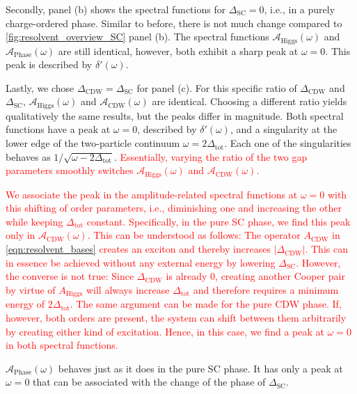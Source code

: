 \documentclass[
    reprint, 
    aps,
    preprintnumbers,
    twocolumn,
    prb,
    superscriptaddress
]{revtex4-2}
\newcommand{\spectral}[1]{\mathcal{A}_\text{#1}  (\omega)}
\begin{document}
Secondly, panel (b) shows the spectral functions for $\Delta_\text{SC} = 0$, i.e., in a purely charge-ordered phase.
Similar to before, there is not much change compared to \autoref{fig:resolvent_overview_SC} panel (b).
The spectral functions $\spectral{Higgs}$ and $\spectral{Phase}$ are still identical, however, both exhibit a sharp peak at $\omega=0$.
This peak is described by $\delta'(\omega)$.

Lastly, we chose $\Delta_\text{CDW} = \Delta_\text{SC}$ for panel (c).
For this specific ratio of $\Delta_\text{CDW}$ and $\Delta_\text{SC}$, $\spectral{Higgs}$ and $\spectral{CDW}$ are identical.
Choosing a different ratio yields qualitatively the same results, but the peaks differ in magnitude.
Both spectral functions have a peak at $\omega = 0$, described by $\delta'(\omega)$, and a singularity at the lower edge of the two-particle continuum $\omega = 2\Delta_\text{tot}$.
Each one of the singularities behaves as $1/\sqrt{\omega - 2 \Delta_\text{tot}}$.
\textcolor{red}{Essentially, varying the ratio of the two gap parameters smoothly switches $\spectral{Higgs}$ and $\spectral{CDW}$.}

\textcolor{red}{We associate the peak in the amplitude-related spectral functions at $\omega=0$ with this shifting of order parameters, i.e., diminishing one and increasing the other while keeping $\Delta_\text{tot}$ constant.
Specifically, in the pure SC phase, we find this peak only in $\spectral{CDW}$.
This can be understood as follows: The operator $A_\text{CDW}$ in \eqref{eqn:resolvent_bases} creates an exciton and thereby increases $|\Delta_\text{CDW}|$.
This can in essence be achieved without any external energy by lowering $\Delta_\text{SC}$.
However, the converse is not true: Since $\Delta_\text{CDW}$ is already 0, creating another Cooper pair by virtue of $A_\text{Higgs}$ will always increase $\Delta_\text{tot}$ and therefore requires a minimum energy of $2 \Delta_\text{tot}$.
The same argument can be made for the pure CDW phase.
If, however, both orders are present, the system can shift between them arbitrarily by creating either kind of excitation.
Hence, in this case, we find a peak at $\omega=0$ in both spectral functions.}

$\spectral{Phase}$ behaves just as it does in the pure SC phase. It has only a peak at $\omega = 0$ that can be associated with the change of the phase of $\Delta_\text{SC}$.

\end{document}
